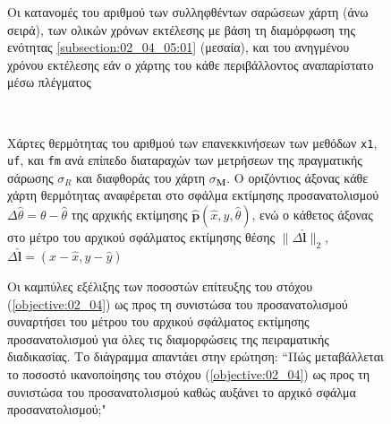 \begin{figure}
  
  \vspace{1cm}
  \caption{\small Οι κατανομές του αριθμού των συλληφθέντων σαρώσεων χάρτη (άνω
           σειρά), των ολικών χρόνων εκτέλεσης με βάση τη διαμόρφωση της
           ενότητας \ref{subsection:02_04_05:01} (μεσαία), και του ανηγμένου
           χρόνου εκτέλεσης εάν ο χάρτης του κάθε περιβάλλοντος αναπαρίστατο
           μέσω πλέγματος}
  \label{fig:02_04_05:03}
\end{figure}

\begin{figure}\centering\vspace{1.5cm}
  \begin{subfigure}{\linewidth}
    
  \end{subfigure}\\\vspace{2.2cm}%
  \begin{subfigure}{\linewidth}\hspace{1.0cm}
    
  \end{subfigure}%
  \vspace{-1cm}
\caption{\small Χάρτες θερμότητας του αριθμού των επανεκκινήσεων των
         μεθόδων \texttt{x1}, \texttt{uf}, και \texttt{fm} ανά επίπεδο
         διαταραχών των μετρήσεων της πραγματικής σάρωσης $\sigma_R$ και
         διαφθοράς του χάρτη $\sigma_{\bm{M}}$. Ο οριζόντιος άξονας κάθε χάρτη
         θερμότητας αναφέρεται στο σφάλμα εκτίμησης προσανατολισμού
         $\Delta\hat{\theta} = \theta-\hat{\theta}$ της αρχικής εκτίμησης
         $\hat{\bm{p}}(\hat{x},\hat{y},\hat{\theta})$, ενώ ο κάθετος άξονας
         στο μέτρο του αρχικού σφάλματος εκτίμησης θέσης
         $\|\Delta \hat{\bm{l}}\|_2$, $\Delta\hat{\bm{l}} = (x-\hat{x}, y-\hat{y})$}
\label{fig:02_04_05:04}
\end{figure}

\begin{figure}\centering
  \vspace{2cm}
  
  \vspace{1.5cm}
  \caption{\small Οι καμπύλες εξέλιξης των ποσοστών επίτευξης του στόχου
           (\ref{objective:02_04}) ως προς τη συνιστώσα του προσανατολισμού
           συναρτήσει του μέτρου του αρχικού σφάλματος εκτίμησης
           προσανατολισμού για όλες τις διαμορφώσεις της πειραματικής
           διαδικασίας. Το διάγραμμα απαντάει στην ερώτηση: ``Πώς μεταβάλλεται
           το ποσοστό ικανοποίησης του στόχου (\ref{objective:02_04}) ως προς
           τη συνιστώσα του προσανατολισμού καθώς αυξάνει το αρχικό σφάλμα
           προσανατολισμού;"}
  \label{fig:02_04_05:10}
\end{figure}


